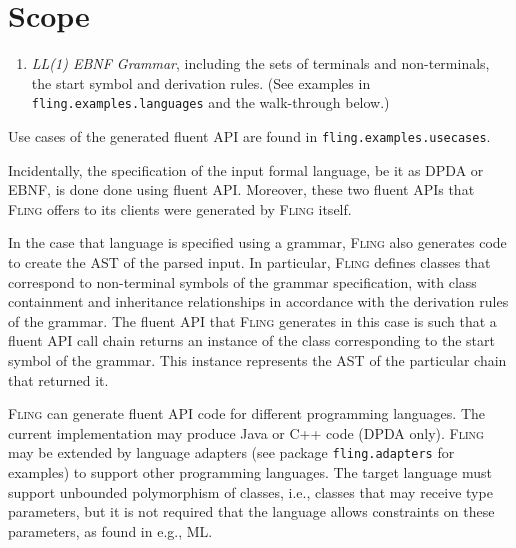 \documentclass[a4paper,UKenglish,cleveref, autoref]{darts-v2019}
\newcommand{\Fling}{F\textsc{ling}\xspace}
\newcommand{\Java}{\textsc{Java}\xspace}
\newcommand{\CC}{\textsc{C++}\xspace}
\newenvironment{scope}{\section{Scope}}{}
\begin{document}
\begin{scope}
\begin{enumerate}
Once the automaton is built, we can request \Fling to generate a fluent API
for it.  shows how this is done.

\begin{excerpt}[language=java,label={lst:generate},caption={%
    Using \Fling to create a fluent API for \Java and \CC}
]
public static final String JavaFluentAPI = 
  new JavaAPIAdapter(
    "fling.examples.generated",  // Package name
    "AnBn",  // The class name.
      "$",   // The terminating symbol
    new NaiveNamer("fling.examples.generated", "AnBn")) //
        .printFluentAPI(new ReliableAPICompiler(dpda).compileFluentAPI());
public static final String CppFluentAPI = new CppAPIAdapter(
  "$", 
  new NaiveNamer("AnBn")) //
    .printFluentAPI(new ReliableAPICompiler(dpda).compileFluentAPI());
  \end{excerpt}

      (This and other examples can be found in \texttt{fling.examples.automata}.)
  \item \emph{LL(1) EBNF Grammar}, including the sets of terminals and non-terminals, the start symbol
    and derivation rules.
      (See examples in \texttt{fling.examples.languages} and the walk-through below.)
\end{enumerate}
Use cases of the generated fluent API are found in \texttt{fling.examples.usecases}.

Incidentally, the specification of the input formal language, be it as DPDA or
EBNF, is done done using fluent API. Moreover, these two fluent APIs that
\Fling offers to its clients were generated by \Fling itself.

In the case that language is specified using a grammar, \Fling also generates
code to create the AST of the parsed input. In particular, \Fling defines
classes that correspond
to non-terminal symbols of the grammar specification, with class containment
and inheritance relationships in accordance with the derivation rules of the
grammar. The fluent API that \Fling generates in this case is such that a
fluent API call chain returns an instance of the class corresponding to the
start symbol of the grammar. This instance represents the AST of the particular
chain that returned it.

\Fling can generate fluent API code for different programming languages. The
current implementation may produce Java or C++ code (DPDA only). \Fling may be
extended by language adapters (see package \texttt{fling.adapters} for
examples) to support other programming languages. The target language must
support unbounded polymorphism of classes, i.e., classes that may receive type
parameters, but it is not required that the language allows constraints on
these parameters, as found in e.g., ML.


\end{scope}
\end{document}
